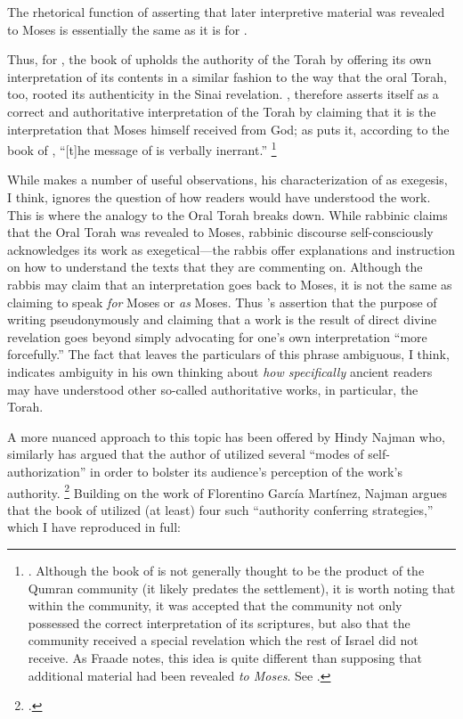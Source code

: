 \noindent
The rhetorical function of asserting that later interpretive material was revealed to Moses is essentially the same as it is for \jub.

Thus, for \vanderkam, the book of \jub upholds the authority of the Torah by offering its own interpretation of its contents in a similar fashion to the way that the oral Torah, too, rooted its authenticity in the Sinai revelation. \jub, therefore asserts itself as a correct and authoritative interpretation of the Torah by claiming that it is the interpretation that Moses himself received from God; as \vanderkam puts it, according to the book of \jub, ``[t]he message of \jub is verbally inerrant.''%
    \footnote{
        \cite[33]{vanderkam_metso-etal2010}.
        Although the book of \jub is not generally thought to be the product of the Qumran community (it likely predates the settlement), it is worth noting that within the community, it was accepted that the community not only possessed the correct interpretation of its scriptures, but also that the community received a special revelation which the rest of Israel did not receive. As Fraade notes, this idea is quite different than supposing that additional material had been revealed \emph{to Moses}. See 
        \cite[67]{fraade_jjs1993}.}

While \vanderkam makes a number of useful observations, his characterization of \jub as exegesis, I think, ignores the question of how readers would have understood the work. This is where the analogy to the Oral Torah breaks down. While rabbinic claims that the Oral Torah was revealed to Moses, rabbinic discourse self-consciously acknowledges its work as exegetical---the rabbis offer explanations and instruction on how to understand the texts that they are commenting on.    %
Although the rabbis may claim that an interpretation goes back to Moses, it is not the same as claiming to speak \emph{for} Moses or \emph{as} Moses. Thus \vanderkam's assertion that the purpose of writing pseudonymously and claiming that a work is the result of direct divine revelation goes beyond simply advocating for one's own interpretation ``more forcefully.'' The fact that \vanderkam leaves the particulars of this phrase ambiguous, I think, indicates ambiguity in his own thinking about \emph{how specifically} ancient readers may have understood \jub \visavis other so-called authoritative works, in particular, the Torah.

A more nuanced approach to this topic has been offered by Hindy Najman who, similarly has argued that the author of \jub utilized several ``modes of self-authorization'' in order to bolster its audience's perception of the work's authority.%
    \footnote{\Cite[380]{najman_jsj1999}.}
Building on the work of Florentino García Martínez,\autocite{martinez_najman-tigchelaar2012} Najman argues that the book of \jub utilized (at least) four such ``authority conferring strategies,'' which I have reproduced in full:

